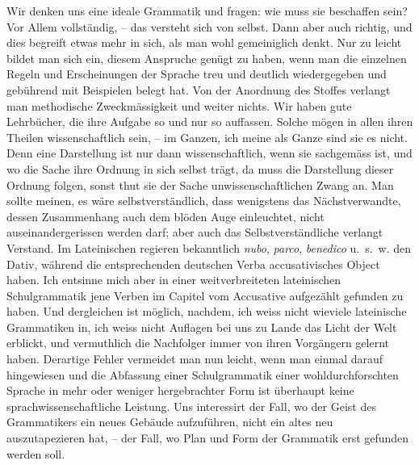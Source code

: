 Wir denken uns eine ideale Grammatik und fragen: wie muss sie beschaffen sein? Vor Allem vollständig, – das versteht sich von selbst. Dann aber auch richtig, und dies begreift etwas mehr in sich, als man wohl gemeiniglich denkt. Nur zu leicht bildet man sich ein, diesem Anspruche genügt zu haben, wenn man die einzelnen Regeln und Erscheinungen der Sprache treu und deutlich wiedergegeben und gebührend mit Beispielen belegt hat. Von der Anordnung des Stoffes verlangt man methodische Zweckmässigkeit und weiter nichts. Wir haben gute Lehrbücher, die ihre Aufgabe so und nur so auffassen. Solche \label{sp.82} mögen in allen ihren Theilen wissenschaftlich sein, – im Ganzen, ich meine als Ganze sind sie es nicht. Denn eine Darstellung ist nur dann wissenschaftlich, wenn sie sachgemäss ist, und wo die Sache ihre Ordnung in sich selbst trägt, da muss die Darstellung dieser Ordnung folgen, sonst thut sie der Sache unwissenschaftlichen Zwang an. Man sollte meinen, es wäre selbstverständlich, dass wenigstens das Nächstverwandte, dessen Zusammenhang auch dem blöden Auge einleuchtet, nicht auseinandergerissen werden darf; aber auch das Selbstverständliche verlangt Verstand. Im Lateinischen regieren bekanntlich \textit{nubo}, \textit{parco}, \textit{benedico} u.~s.~w. den Dativ, während die entsprechenden deutschen Verba accusativisches Object haben. Ich entsinne mich aber in einer weitverbreiteten lateinischen Schulgrammatik jene Verben im Capitel vom Accusative aufgezählt gefunden zu haben. Und dergleichen ist möglich, nachdem, ich weiss nicht wieviele lateinische Grammatiken in, ich weiss nicht  Auflagen bei uns zu Lande das Licht der Welt erblickt, und vermuthlich die Nachfolger immer von ihren Vorgängern gelernt haben. Derartige Fehler vermeidet man nun leicht, wenn man einmal darauf hingewiesen  und die Abfassung einer Schulgrammatik einer wohldurchforschten Sprache in mehr oder weniger hergebrachter Form ist überhaupt keine sprachwissenschaftliche Leistung. Uns interessirt der Fall, \label{fp.84} wo der Geist des Grammatikers ein neues Gebäude aufzuführen, nicht  ein altes neu auszutapezieren hat, – der Fall, wo Plan und Form der Grammatik erst gefunden werden soll.

